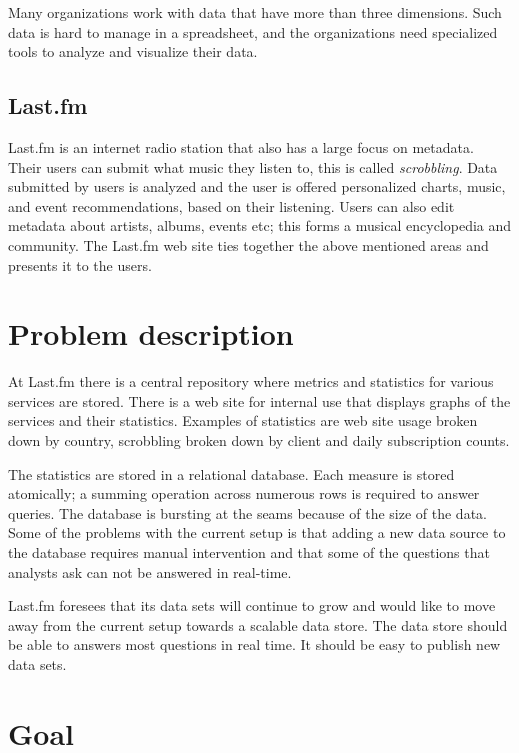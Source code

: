 Many organizations work with data that have more than three dimensions. Such
data is hard to manage in a spreadsheet, and the organizations need
specialized tools to analyze and visualize their data.


\subsection*{Last.fm}

Last.fm is an internet radio station that also has a large focus on metadata.
Their users can submit what music they listen to, this is called
\textit{scrobbling}. Data submitted by users is analyzed and the user is offered
personalized charts, music, and event recommendations, based on their listening.
Users can also edit metadata about artists, albums, events etc; this forms a
musical encyclopedia and community. The Last.fm web site ties together the above
mentioned areas and presents it to the users.


\section*{Problem description}

At Last.fm there is a central repository where metrics and statistics for
various services are stored. There is a web site for internal use that
displays graphs of the services and their statistics. Examples of statistics
are web site usage broken down by country, scrobbling broken down by client
and daily subscription counts.

The statistics are stored in a relational database. Each measure is stored
atomically; a summing operation across numerous rows is required to answer
queries. The database is bursting at the seams because of the size of the
data. Some of the problems with the current setup is that adding a new data
source to the database requires manual intervention and that some of the
questions that analysts ask can not be answered in real-time.

Last.fm foresees that its data sets will continue to grow and would like to
move away from the current setup towards a scalable data store. The data store
should be able to answers most questions in real time. It should be easy
to publish new data sets.


\section*{Goal}


